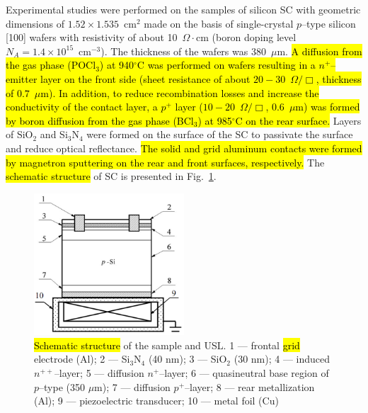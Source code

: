 \documentclass[sn-mathphys]{sn-jnl}%
\theoremstyle{thmstyleone}%
\theoremstyle{thmstyletwo}%
\theoremstyle{thmstylethree}%
\begin{document}
Experimental studies were performed on the samples of silicon SC with geometric dimensions of $1.52\times1.535$~cm$^2$ made on the basis of single-crystal  $p$--type silicon [100] wafers with resistivity of about 10~$\Omega\cdot$cm
(boron doping level  $N_A=1.4\times10^{15}$~cm$^{-3}$).
The thickness of the wafers was 380~$\mu$m.
\hl{ A diffusion from the gas phase (POCl$_3$) at 940$^\circ$C was performed on wafers resulting in a $n^+$--emitter layer on
the front side (sheet resistance of about $20-30$~$\Omega/\Box$, thickness of $0.7$~$\mu$m).
In addition, to reduce recombination losses and increase the conductivity of the contact layer,
a $p^+$ layer ($10-20$~$\Omega/\Box$, $0.6$~$\mu$m) was formed by boron diffusion from
the gas phase (BCl$_3$) at 985$^\circ$C on the rear surface.}
Layers of SiO$_2$ and Si$_3$N$_4$ were formed on the surface of the SC to passivate the surface and reduce optical reflectance.
\hl{ The solid and grid aluminum contacts were formed by magnetron sputtering on the rear and front surfaces, respectively.}
The \hl{schematic structure} of SC is presented in Fig.~\ref{figChem}.
\begin{figure}
\centering
\includegraphics[width=0.5\textwidth]{Fig1}
\caption{\hl{Schematic structure} of the sample and USL.
1 --- frontal \hl{grid} electrode (Al);
2 --- Si$_3$N$_4$ (40 nm);
3 --- SiO$_2$ (30 nm);
4 --- induced $n^{++}$--layer;
5 --- diffusion $n^+$--layer;
6 --- quasineutral base region of $p$--type (350 $\mu$m);
7 --- diffusion $p^+$--layer;
8 --- rear metallization (Al);
9 --- piezoelectric transducer;
10 --- metal foil (Cu)}
\label{figChem}       %
\end{figure}
\end{document}
